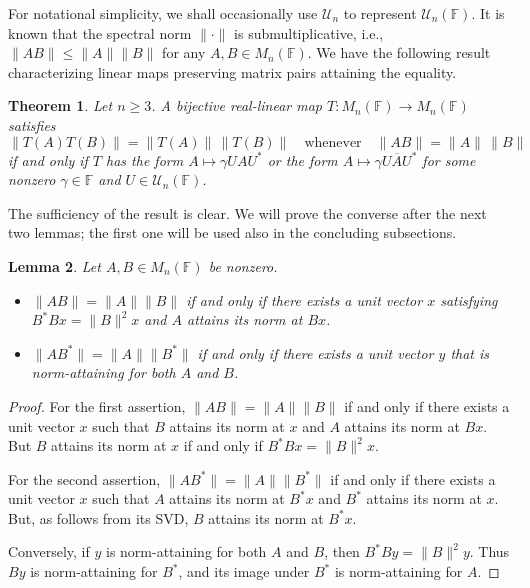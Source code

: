 \documentclass[11pt]{article}
\newtheorem{theorem}{Theorem}[section]
\newtheorem{lemma}[theorem]{Lemma}
\numberwithin{equation}{section}
\def\IF{{\mathbb F}}
\begin{document}
For notational simplicity, we shall occasionally  use
${\mathcal U}_n$ to represent ${\mathcal U}_n(\IF)$.
It is known that the spectral norm $\|\cdot\|$ is submultiplicative, i.e.,
$\|AB\| \le \|A\| \|B\|$ for any $A, B \in M_n(\IF)$.
We have the following result characterizing linear maps preserving matrix pairs attaining the equality.



\begin{theorem}\label{main2} Let $n \geq 3$.
A bijective real-linear map $T \colon M_n(\IF) \to M_n(\IF)$ satisfies
\[
\|T(A)T(B)\| = \|T(A)\| \, \|T(B)\|
\quad \text{whenever} \quad
\|AB\| = \|A\| \, \|B\|
\]
if and only if $T$ has the form $A \mapsto \gamma U A U^*$  or the form $A \mapsto \gamma U \overline{A} U^*$  for some nonzero $\gamma \in \IF$ and $U \in {\mathcal U}_n(\IF)$.
\end{theorem}

The sufficiency of the result is clear.  We will prove the converse after  the next two lemmas; the first one will be used also in the concluding subsections.

\begin{lemma}\label{L:basic}
	Let $A, B \in M_n(\IF)$ be nonzero.
	\begin{itemize}
		\item[{\rm (i)}] $\|AB\| = \|A\| \|B\|$ if and only if there exists a unit vector $x$ satisfying $B^* Bx = \|B\|^2 x$ and $A$ attains its norm at $Bx$.
		\item[{\rm (ii)}] $\|AB^*\| = \|A\| \|B^*\|$ if and only if there exists a unit vector $y$ that is norm-attaining for both $A$ and $B$.
	\end{itemize}
\end{lemma}

\begin{proof}
	For the first assertion, $\|AB\| = \|A\| \|B\|$ if and only if there exists a unit vector $x$ such that $B$ attains its norm at $x$ and $A$ attains its norm at $Bx$.  But $B$ attains its norm at $x$ if and only if $B^*Bx = \|B\|^2 x$.

	For the second assertion, $\|AB^*\| = \|A\| \|B^*\|$ if and only if there exists a unit vector $x$ such that $A$ attains its norm at $B^* x$ and $B^*$ attains its norm at $x$.  But, as follows from its SVD, $B$ attains its norm at $B^* x$.

	Conversely, if $y$ is norm-attaining for both $A$ and $B$, then $B^*By = \|B\|^2 y$.  Thus $By$ is norm-attaining for $B^*$, and its image under $B^*$ is norm-attaining for $A$.
\end{proof}
\end{document}
